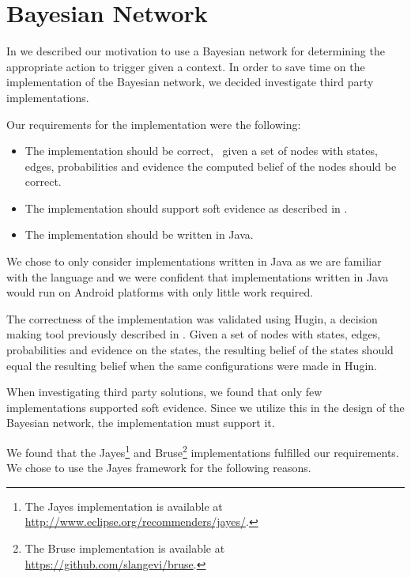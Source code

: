 \section{Bayesian Network}
\label{sec:implementation:bayesian-network}

In  we described our motivation to use a Bayesian network for determining the appropriate action to trigger given a context. In order to save time on the implementation of the Bayesian network, we decided investigate third party implementations.

Our requirements for the implementation were the following:

\begin{itemize}
\item The implementation should be correct, \ie~given a set of nodes with states, edges, probabilities and evidence the computed belief of the nodes should be correct.
\item The implementation should support soft evidence as described in .
\item The implementation should be written in Java.
\end{itemize}

We chose to only consider implementations written in Java as we are familiar with the language and we were confident that implementations written in Java would run on Android platforms with only little work required. 

The correctness of the implementation was validated using Hugin, a decision making tool previously described in . Given a set of nodes with states, edges, probabilities and evidence on the states, the resulting belief of the states should equal the resulting belief when the same configurations were made in Hugin.

When investigating third party solutions, we found that only few implementations supported soft evidence. Since we utilize this in the design of the Bayesian network, the implementation must support it. 

We found that the Jayes\footnote{The Jayes implementation is available at \url{http://www.eclipse.org/recommenders/jayes/}.} and Bruse\footnote{The Bruse implementation is available at \url{https://github.com/slangevi/bruse}.} implementations fulfilled our requirements. We chose to use the Jayes framework for the following reasons.


